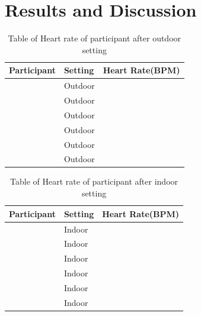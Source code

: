 \documentclass{sigchi}
\begin{document}
\section{Results and Discussion}
\setlength{\arrayrulewidth}{1mm}
\setlength{\tabcolsep}{8pt}
\renewcommand{\arraystretch}{1.25}
{
\begin{table}
\begin{tabularx}{0.45\textwidth}{ 
  | >{\centering\arraybackslash}X 
  | >{\centering\arraybackslash}X 
  | >{\centering\arraybackslash}X | }
\hline
Participant & Setting & Heart Rate(BPM) \\
\hline
1 & Outdoor & 102 \\
\hline
2 & Outdoor & 90 \\
\hline
3 & Outdoor & 127 \\
\hline
4 & Outdoor & 112 \\
\hline
5 & Outdoor & 120 \\
\hline
6 & Outdoor & 136 \\
\hline
\end{tabularx}
\caption{Table of Heart rate of participant after outdoor setting }
\label{tab:my_label4}
\end{table}
}

\setlength{\arrayrulewidth}{1mm}
\setlength{\tabcolsep}{8pt}
\renewcommand{\arraystretch}{1.25}
{
\begin{table}
\begin{tabularx}{0.45\textwidth}{ 
  | >{\centering\arraybackslash}X 
  | >{\centering\arraybackslash}X 
  | >{\centering\arraybackslash}X | }
\hline
Participant & Setting & Heart Rate(BPM) \\
\hline
1 & Indoor & 73 \\
\hline
2 & Indoor & 71 \\
\hline
3 & Indoor & 85 \\
\hline
4 & Indoor & 79 \\
\hline
5 & Indoor & 81 \\
\hline
6 & Indoor & 90 \\
\hline
\end{tabularx}
\caption{Table of Heart rate of participant after indoor setting}
\label{tab:my_label5}
\end{table}
}
\end{document}
